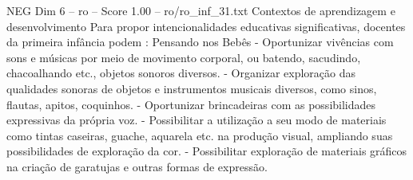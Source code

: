 \begin{textsample}{NEG Dim 6 – ro – Score 1.00 – ro/ro\_inf\_31.txt}  \label{ex:f6_neg_159}
Contextos de aprendizagem e desenvolvimento Para propor intencionalidades educativas significativas, docentes da primeira infância podem : Pensando nos Bebês - Oportunizar vivências com sons e músicas por meio de movimento corporal, ou batendo, sacudindo, chacoalhando etc., objetos sonoros diversos. - Organizar exploração das qualidades sonoras de objetos e instrumentos musicais diversos, como sinos, flautas, apitos, coquinhos. - Oportunizar brincadeiras com as possibilidades expressivas da própria voz. - Possibilitar a utilização a seu modo de materiais como tintas caseiras, guache, aquarela etc. na produção visual, ampliando suas possibilidades de exploração da cor. - Possibilitar exploração de materiais gráficos na criação de garatujas e outras formas de expressão.

\end{textsample}
